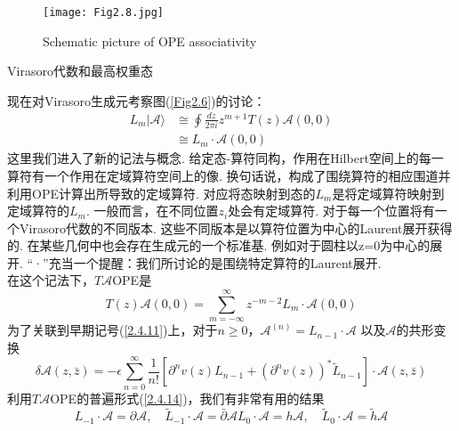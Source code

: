 \begin{figure}
	\begin{center}
		\texttt{[image: Fig2.8.jpg]}\\
		\caption{Schematic picture of OPE associativity}\label{Fig2.8}
	\end{center}
\end{figure}
\centerline{\Large Virasoro代数和最高权重态}
现在对Virasoro生成元考察图(\ref{Fig2.6})的讨论：
\begin{equation}
\begin{aligned}
L_{m}|\mathscr{A}\rangle & \cong \oint \frac{d z}{2 \pi i} z^{m+1} T(z) \mathscr{A}(0,0) \\
& \cong L_{m} \cdot \mathscr{A}(0,0)
\end{aligned}
\end{equation}
这里我们进入了新的记法与概念. 给定态-算符同构，作用在Hilbert空间上的每一算符有一个作用在定域算符空间上的像. 换句话说，构成了围绕算符的相应围道并利用OPE计算出所导致的定域算符. 对应将态映射到态的$L_m$是将定域算符映射到定域算符的$L_m$. 一般而言，在不同位置$z_i$处会有定域算符. 对于每一个位置将有一个Virasoro代数的不同版本. 这些不同版本是以算符位置为中心的Laurent展开获得的. 在某些几何中也会存在生成元的一个标准基. 例如对于圆柱以z=0为中心的展开. “·”充当一个提醒：我们所讨论的是围绕特定算符的Laurent展开. \\
在这个记法下，$T\mathscr{A}$OPE是
\begin{equation}\label{2.9.5}
T(z) \mathscr{A}(0,0)=\sum_{m=-\infty}^{\infty} z^{-m-2} L_{m} \cdot \mathscr{A}(0,0)
\end{equation}
为了关联到早期记号(\ref{2.4.11})上，对于$n \geq 0$，$\mathscr{A}^{(n)}=L_{n-1} \cdot \mathscr{A}$ 以及$\mathscr{A}$的共形变换
\begin{equation}
\delta \mathscr{A}(z, \bar{z})=-\epsilon \sum_{n=0}^{\infty} \frac{1}{n !}\left[\partial^{n} v(z) L_{n-1}+\left(\partial^{n} v(z)\right)^{*} \tilde{L}_{n-1}\right] \cdot \mathscr{A}(z, \bar{z})
\end{equation}
利用$T\mathscr{A}$OPE的普遍形式(\ref{2.4.14})，我们有非常有用的结果
\begin{subequations}\label{2.9.7}
\begin{equation}
L_{-1} \cdot \mathscr{A}=\partial \mathscr{A}, \quad \tilde{L}_{-1} \cdot \mathscr{A}=\bar{\partial} \mathscr{A}
\end{equation}
\begin{equation}
L_{0} \cdot \mathscr{A}=h \mathscr{A}, \quad \tilde{L}_{0} \cdot \mathscr{A}=\tilde{h} \mathscr{A}
\end{equation}
\end{subequations}
